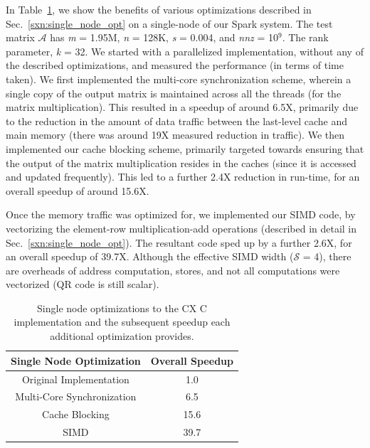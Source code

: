       In Table~\ref{tab:single_node}, we show the benefits of various
      optimizations described in
      Sec.~\ref{sxn:single_node_opt} on a single-node of our Spark system. 
      The test matrix $\mathcal{A}$ has {\it{m}} = 1.95M, {\it{n}} = 128K,
      {\it{s}} = 0.004, and {\it{nnz}} = 10$^9$. The rank parameter,
      {\it{k}} = 32. We started with a parallelized implementation,
      without any of the described optimizations, and measured the
      performance (in terms of time taken). We first implemented the
      multi-core synchronization scheme, wherein a single copy of the
      output matrix is maintained across all the threads (for the matrix multiplication).
      This resulted in a speedup of around 6.5X, primarily due to
      the reduction in the amount of data traffic between the
      last-level cache and main memory (there was around 19X measured reduction
      in traffic). We then implemented our cache blocking scheme,
      primarily targeted towards ensuring that the output of the
      matrix multiplication resides in the caches (since it is
      accessed and updated frequently). This led to a further 2.4X
     reduction in run-time, for an overall speedup of around 15.6X.

     Once the memory traffic was optimized for, we implemented our
     SIMD code, by vectorizing the element-row multiplication-add
     operations (described in detail in Sec.~\ref{sxn:single_node_opt}). 
     The resultant code sped up by a further 2.6X, for an overall
     speedup of 39.7X. Although the effective SIMD width
 ($\mathcal{S}$ = 4), there are overheads of address computation,
 stores, and not all computations were vectorized (QR code is still
 scalar).


 
  \begin{table}
  \begin{center}
  \begin{tabular}{ |c|c| } 
  \hline
  Single Node Optimization & Overall Speedup\\
  \hline
  Original Implementation & 1.0  \\
  Multi-Core Synchronization & 6.5 \\
  Cache Blocking & 15.6 \\
  SIMD & 39.7 \\
  \hline

  \end{tabular}
  \end{center}
  \caption{Single node optimizations to the CX C implementation and
  the subsequent speedup  each additional optimization provides.}
  \label{tab:single_node}
  \end{table}
 




